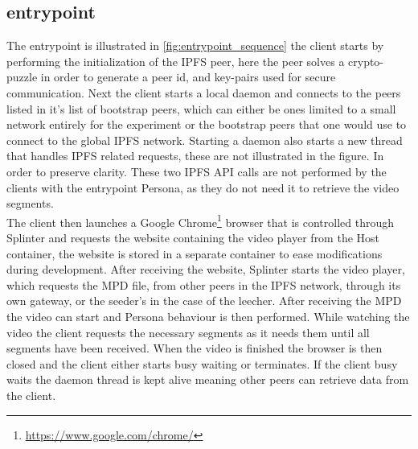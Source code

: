

\subsection{entrypoint}
\label{sec:experiment_entrypoint}

The entrypoint is illustrated in \autoref{fig:entrypoint_sequence} the client starts by performing the initialization of the \ac{IPFS} peer, here the peer solves a crypto-puzzle in order to generate a peer id, and key-pairs used for secure communication.
Next the client starts a local daemon and connects to the peers listed in it's list of bootstrap peers, which can either be ones limited to a small network entirely for the experiment or the bootstrap peers that one would use to connect to the global \ac{IPFS} network.
Starting a daemon also starts a new thread that handles \ac{IPFS} related requests, these are not illustrated in the figure. In order to preserve clarity. These two \ac{IPFS} \ac{API} calls are not performed by the clients with the entrypoint Persona, as they do not need it to retrieve the video segments.\\
The client then launches a Google Chrome\footnote{\url{https://www.google.com/chrome/}} browser that is controlled through Splinter and requests the website containing the video player from the Host container, the website is stored in a separate container to ease modifications during development.
After receiving the website, Splinter starts the video player, which requests the \ac{MPD} file, from other peers in the \ac{IPFS} network, through its own gateway, or the seeder's in the case of the leecher.
After receiving the \ac{MPD} the video can start and Persona behaviour is then performed. While watching the video the client requests the necessary segments as it needs them until all segments have been received.
When the video is finished the browser is then closed and the client either starts busy waiting or terminates. If the client busy waits the daemon thread is kept alive meaning other peers can retrieve data from the client.\\



